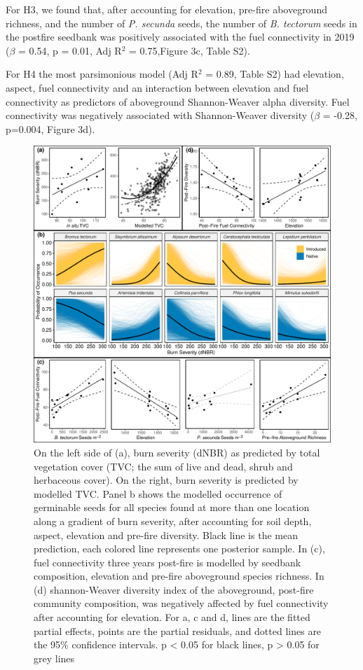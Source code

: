\documentclass[
  12pt,
]{article}
\begin{document}
For H3, we found that, after accounting for elevation, pre-fire
aboveground richness, and the number of \emph{P. secunda} seeds, the
number of \emph{B. tectorum} seeds in the postfire seedbank was
positively associated with the fuel connectivity in 2019 (\(\beta\) =
0.54, p = 0.01, Adj R\(^2\) = 0.75,Figure 3c, Table S2).

For H4 the most parsimonious model (Adj R\(^2\) = 0.89, Table S2) had
elevation, aspect, fuel connectivity and an interaction between
elevation and fuel connectivity as predictors of aboveground
Shannon-Weaver alpha diversity. Fuel connectivity was negatively
associated with Shannon-Weaver diversity (\(\beta\) = -0.28, p=0.004,
Figure 3d).

\begin{figure}
\centering
\includegraphics{images/big_plot.pdf}
\caption{On the left side of (a), burn severity (dNBR) as predicted by
total vegetation cover (TVC; the sum of live and dead, shrub and
herbaceous cover). On the right, burn severity is predicted by modelled
TVC. Panel b shows the modelled occurrence of germinable seeds for all
species found at more than one location along a gradient of burn
severity, after accounting for soil depth, aspect, elevation and
pre-fire diversity. Black line is the mean prediction, each colored line
represents one posterior sample. In (c), fuel connectivity three years
post-fire is modelled by seedbank composition, elevation and pre-fire
aboveground species richness. In (d) shannon-Weaver diversity index of
the aboveground, post-fire community composition, was negatively
affected by fuel connectivity after accounting for elevation. For a, c
and d, lines are the fitted partial effects, points are the partial
residuals, and dotted lines are the 95\% confidence intervals. p
\textless{} 0.05 for black lines, p \textgreater{} 0.05 for grey lines}
\end{figure}
\end{document}
